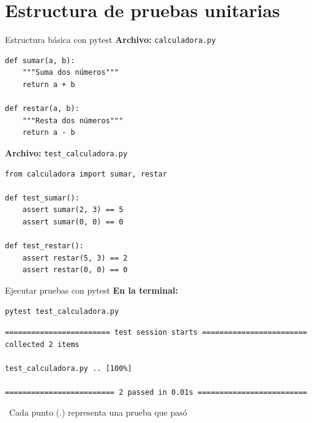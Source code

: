\documentclass{beamer}
\begin{document}
\section{Estructura de pruebas unitarias}

\begin{frame}[fragile]{Estructura básica con pytest \faFileCode}
\textbf{Archivo:} \texttt{calculadora.py}
\begin{lstlisting}
def sumar(a, b):
    """Suma dos números"""
    return a + b

def restar(a, b):
    """Resta dos números"""
    return a - b
\end{lstlisting}

\vspace{0.2cm}
\textbf{Archivo:} \texttt{test\_calculadora.py}
\begin{lstlisting}
from calculadora import sumar, restar

def test_sumar():
    assert sumar(2, 3) == 5
    assert sumar(0, 0) == 0

def test_restar():
    assert restar(5, 3) == 2
    assert restar(0, 0) == 0
\end{lstlisting}
\end{frame}

\begin{frame}[fragile]{Ejecutar pruebas con pytest \faPlay}
\textbf{En la terminal:}
\begin{lstlisting}[language=bash, numbers=none]
pytest test_calculadora.py
\end{lstlisting}

\vspace{-0.2cm}
\begin{tcolorbox}[colback=green!10,colframe=green,title={\small\faArrowCircleRight \ Salida},coltitle=fg0,left=3pt,right=3pt,top=2pt,bottom=2pt,boxsep=1pt]
\small\texttt{======================== test session starts ========================\\
collected 2 items\\
\ \\
test\_calculadora.py ..                                        [100\%]\\
\ \\
========================= 2 passed in 0.01s =========================}
\end{tcolorbox}

\vspace{-0.1cm}
\begin{notebox}
\small\faCheckCircle\ Cada punto (.) representa una prueba que pasó
\end{notebox}
\end{frame}
\end{document}

